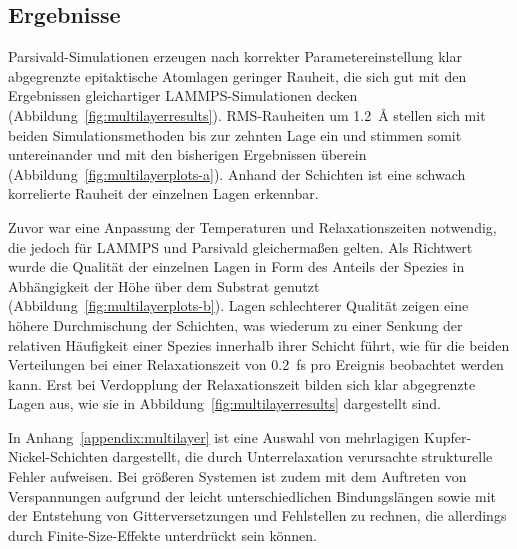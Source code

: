 \subsection{Ergebnisse}

Parsivald-Simulationen erzeugen nach korrekter Parametereinstellung klar abgegrenzte epitaktische Atomlagen geringer Rauheit, die sich gut mit den Ergebnissen gleichartiger LAMMPS-Simulationen decken (Abbildung~\ref{fig:multilayerresults}).
RMS-Rauheiten um \SI{1.2}{\angstrom} stellen sich mit beiden Simulationsmethoden bis zur zehnten Lage ein und stimmen somit untereinander und mit den bisherigen Ergebnissen überein (Abbildung~\ref{fig:multilayerplots-a}).
Anhand der Schichten ist eine schwach korrelierte Rauheit der einzelnen Lagen erkennbar.

Zuvor war eine Anpassung der Temperaturen und Relaxationszeiten notwendig, die jedoch für LAMMPS und Parsivald gleichermaßen gelten.
Als Richtwert wurde die Qualität der einzelnen Lagen in Form des Anteils der Spezies in Abhängigkeit der Höhe über dem Substrat genutzt (Abbildung~\ref{fig:multilayerplots-b}).
Lagen schlechterer Qualität zeigen eine höhere Durchmischung der Schichten, was wiederum zu einer Senkung der relativen Häufigkeit einer Spezies innerhalb ihrer Schicht führt, wie für die beiden Verteilungen bei einer Relaxationszeit von \SI{0.2}{\femto\second} pro Ereignis beobachtet werden kann.
Erst bei Verdopplung der Relaxationszeit bilden sich klar abgegrenzte Lagen aus, wie sie in Abbildung~\ref{fig:multilayerresults} dargestellt sind.

In Anhang~\ref{appendix:multilayer} ist eine Auswahl von mehrlagigen Kupfer-Nickel-Schichten dargestellt, die durch Unterrelaxation verursachte strukturelle Fehler aufweisen.
Bei größeren Systemen ist zudem mit dem Auftreten von Verspannungen aufgrund der leicht unterschiedlichen Bindungslängen sowie mit der Entstehung von Gitterversetzungen und Fehlstellen zu rechnen, die allerdings durch Finite-Size-Effekte unterdrückt sein können.

